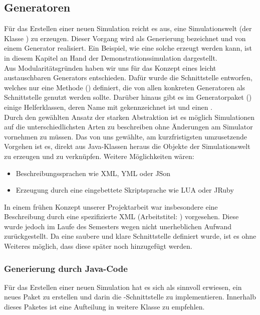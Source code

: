 \subsection{Generatoren}\label{subsec:real_generator}
Für das Erstellen einer neuen Simulation reicht es aus, eine Simulationswelt (der Klasse ) zu erzeugen. Dieser Vorgang wird als Generierung bezeichnet und von einem Generator realisiert.
Ein Beispiel, wie eine solche erzeugt werden kann, ist in diesem Kapitel an Hand der Demonstrationssimulation dargestellt.\\ 

Aus Modularitätsgründen haben wir uns für das Konzept eines leicht austauschbaren Generators entschieden. Dafür wurde die Schnittstelle  entworfen, welches nur eine Methode () definiert, die von allen konkreten Generatoren als Schnittstelle genutzt werden sollte.
Darüber hinaus gibt es im Generatorpaket () einige Helferklassen, deren Name mit  gekennzeichnet ist und einen .\\

Durch den gewählten Ansatz der starken Abstraktion ist es möglich Simulationen auf die unterschiedlichsten Arten zu beschreiben ohne Änderungen am Simulator vornehmen zu müssen. Das von uns gewählte, am kurzfristigsten umzusetzende Vorgehen ist es, direkt aus Java-Klassen heraus die Objekte der Simulationswelt zu erzeugen und zu verknüpfen. Weitere Möglichkeiten wären:
\begin{itemize}
  \item{Beschreibungssprachen wie XML, YML oder JSon}
  \item{Erzeugung durch eine eingebettete Skriptsprache wie LUA oder JRuby}
\end{itemize}
In einem frühen Konzept unserer Projektarbeit war insbesondere eine Beschreibung durch eine spezifizierte XML (Arbeitstitel: ) vorgesehen. Diese wurde jedoch im Laufe des Semesters wegen nicht unerheblichen Aufwand zurückgestellt. Da eine saubere und klare Schnittstelle definiert wurde, ist es ohne Weiteres möglich, dass diese später noch hinzugefügt werden.

\subsubsection{Generierung durch Java-Code}\label{subsec:real_generator_java}
Für das Erstellen einer neuen Simulation hat es sich als sinnvoll erwiesen, ein neues Paket zu erstellen und darin die -Schnittstelle zu implementieren. Innerhalb dieses Paketes ist eine Aufteilung in weitere Klasse zu empfehlen.

